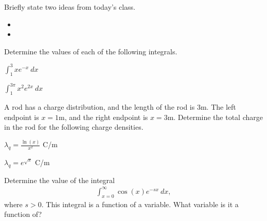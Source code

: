 \postClass

\begin{problem}
\item Briefly state two ideas from today's class.
  \begin{itemize}
  \item
  \item
  \end{itemize}
\item
  \begin{subproblem}
    \item
  \end{subproblem}
\end{problem}



\begin{problem}
\item Determine the values of each of the following integrals.
  \begin{subproblem}
  \item $\int^{3}_1 x e^{-x} ~ dx$
    \vfill
  \item $\int^{3\pi}_1 x^2 e^{2x} ~ dx$
    \vfill
  \end{subproblem}
\end{problem}



\begin{problem}
\item A rod has a charge distribution, and the length of the rod is
  3m. The left endpoint is $x=1$m, and the right endpoint is
  $x=3$m. Determine the total charge in the rod for the following
  charge densities.
  \begin{subproblem}
    \item $\lambda_q = \frac{\ln(x)}{x^2} $ C/m
      \vfill
    \item $\lambda_q = e^{\sqrt{x}}$ C/m
      \vfill
  \end{subproblem}
  \clearpage
  \item  Determine the value of the integral
  \begin{eqnarray*}
    \int_{x=0}^\infty \cos(x) e^{-sx} ~ dx,
  \end{eqnarray*}
  where $s>0$.
  This integral is a function of a variable. What variable is it a function of?
  \vfill
\end{problem}

